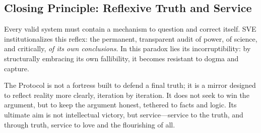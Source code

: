 \documentclass[11pt,a4paper]{article}
\begin{document}
\vspace{1.5em}

\subsection*{\textcolor{headercolor}{Closing Principle: Reflexive Truth and Service}}

Every valid system must contain a mechanism to question and correct itself. SVE institutionalizes this reflex: the permanent, transparent audit of power, of science, and critically, \textit{of its own conclusions}. In this paradox lies its incorruptibility: by structurally embracing its own fallibility, it becomes resistant to dogma and capture.

The Protocol is not a fortress built to defend a final truth; it is a mirror designed to reflect reality more clearly, iteration by iteration. It does not seek to win the argument, but to keep the argument honest, tethered to facts and logic. Its ultimate aim is not intellectual victory, but service—service to the truth, and through truth, service to love and the flourishing of all.

\vspace{2em}
\end{document}
